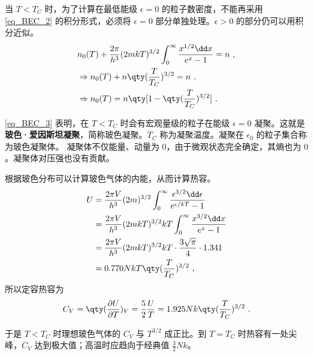 当 $T<T_C$ 时，为了计算在最低能级 $\epsilon=0$ 的粒子数密度，不能再采用 \autoref{eq_BEC_2} 的积分形式，必须将 $\epsilon=0$ 部分单独处理。$\epsilon>0$ 的部分仍可以用积分近似。
\begin{equation}\label{eq_BEC_3}
\begin{aligned}
&n_0(T)+\frac{2\pi}{h^3}(2mkT)^{3/2}\int_0^\infty \frac{x^{1/2}\dd x}{e^x-1}=n~,\\
&\Rightarrow n_0(T)+n\qty(\frac{T}{T_C})^{3/2}=n~,\\
&\Rightarrow n_0(T)=n\qty[1-\qty(\frac{T}{T_C})^{3/2}]~.
\end{aligned}
\end{equation}


\autoref{eq_BEC_3} 表明，在 $T<T_C$ 时会有宏观量级的粒子在能级 $\epsilon=0$ 凝聚。这就是\textbf{玻色·爱因斯坦凝聚}，简称玻色凝聚。$T_C$ 称为凝聚温度。凝聚在 $\epsilon_0$ 的粒子集合称为玻色凝聚体。 凝聚体不仅能量、动量为 $0$，由于微观状态完全确定，其熵也为 $0$。凝聚体对压强也没有贡献。

根据玻色分布可以计算玻色气体的内能，从而计算热容。
\begin{equation}
\begin{aligned}
U&=\frac{2\pi V}{h^3}(2m)^{3/2}\int_0^\infty \frac{\epsilon^{3/2}\dd \epsilon}{e^{\epsilon/kT}-1}\\
&=\frac{2\pi V}{h^3}(2mkT)^{3/2}kT\int_0^\infty \frac{x^{3/2}\dd x}{e^{x}-1}\\&=\frac{2\pi V}{h^3}(2mkT)^{3/2}kT\cdot \frac{3\sqrt{\pi}}{4}\cdot 1.341
\\
&=0.770NkT\qty(\frac{T}{T_C})^{3/2}~,
\end{aligned}
\end{equation}
所以定容热容为
\begin{equation}
C_V=\qty(\frac{\partial U}{\partial T})_V=\frac{5}{2}\frac{U}{T}=1.925Nk\qty(\frac{T}{T_C})^{3/2}~.
\end{equation}

于是 $T<T_C$ 时理想玻色气体的 $C_V$ 与 $T^{3/2}$ 成正比。到 $T=T_C$ 时热容有一处尖峰，$C_V$ 达到极大值；高温时应趋向于经典值 $\frac{3}{2}Nk$。